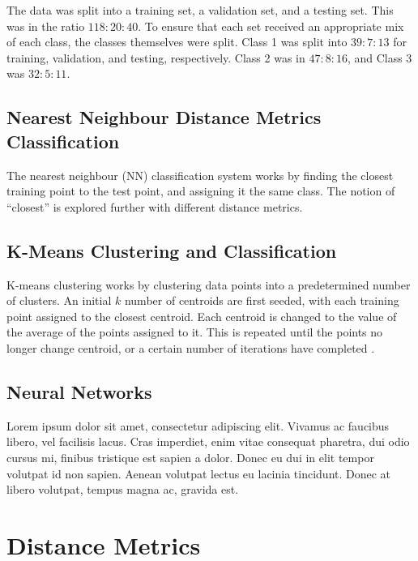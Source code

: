 \documentclass[a4paper, 10pt, conference]{ieeeconf}
\begin{document}
The data was split into a training set, a validation set, and a testing set. This was in the ratio $118:20:40$. To ensure that each set received an appropriate mix of each class, the classes themselves were split. Class 1 was split into $39:7:13$ for training, validation, and testing, respectively. Class 2 was in $47:8:16$, and Class 3 was $32:5:11$.

\subsection{Nearest Neighbour Distance Metrics Classification}
The nearest neighbour (NN) classification system works by finding the closest training point to the test point, and assigning it the same class. The notion of ``closest'' is explored further with different distance metrics.

\subsection{K-Means Clustering and Classification}
K-means clustering works by clustering data points into a predetermined number of clusters. An initial $k$ number of centroids are first seeded, with each training point assigned to the closest centroid. Each centroid is changed to the value of the average of the points assigned to it. This is repeated until the points no longer change centroid, or a certain number of iterations have completed \cite{kmeans}.

\subsection{Neural Networks}
Lorem ipsum dolor sit amet, consectetur adipiscing elit. Vivamus ac faucibus libero, vel facilisis lacus. Cras imperdiet, enim vitae consequat pharetra, dui odio cursus mi, finibus tristique est sapien a dolor. Donec eu dui in elit tempor volutpat id non sapien. Aenean volutpat lectus eu lacinia tincidunt. Donec at libero volutpat, tempus magna ac, gravida est.

\section{Distance Metrics}
\end{document}
